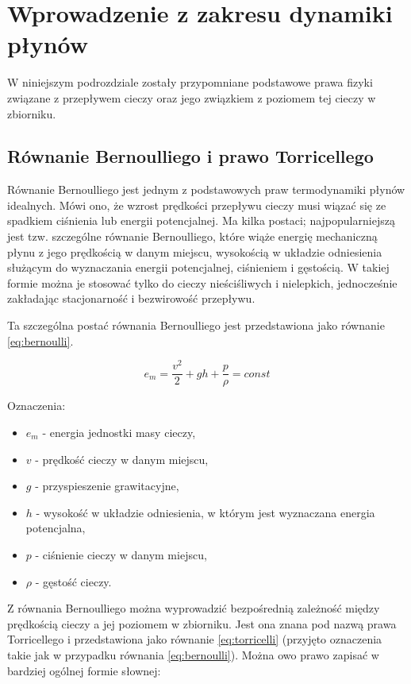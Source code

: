\section{Wprowadzenie z zakresu dynamiki płynów}
\label{sec:plyny}

W niniejszym podrozdziale zostały przypomniane podstawowe prawa fizyki związane z przepływem cieczy oraz jego związkiem z poziomem tej cieczy w zbiorniku.

\subsection{Równanie Bernoulliego i prawo Torricellego}
\label{sub:plyny-torr}

Równanie Bernoulliego jest jednym z podstawowych praw termodynamiki płynów idealnych. Mówi ono, że wzrost prędkości przepływu cieczy musi wiązać się ze spadkiem ciśnienia lub energii potencjalnej.
Ma kilka postaci; najpopularniejszą jest tzw. szczególne równanie Bernoulliego, które wiąże energię mechaniczną płynu z jego prędkością w danym miejscu, wysokością w układzie odniesienia służącym do wyznaczania energii potencjalnej, ciśnieniem i gęstością.
W takiej formie można je stosować tylko do cieczy nieściśliwych i nielepkich, jednocześnie zakładając stacjonarność i bezwirowość przepływu.

Ta szczególna postać równania Bernoulliego jest przedstawiona jako równanie \ref{eq:bernoulli}.

\begin{equation}\label{eq:bernoulli}
e_{m} = \frac{v^2}{2} + gh + \frac{p}{\rho} = const
\end{equation}

Oznaczenia:
\begin{itemize}
	\item $e_{m}$ - energia jednostki masy cieczy,
	\item $v$ - prędkość cieczy w danym miejscu,
	\item $g$ - przyspieszenie grawitacyjne,
	\item $h$ - wysokość w układzie odniesienia, w którym jest wyznaczana energia potencjalna,
	\item $p$ - ciśnienie cieczy w danym miejscu,
	\item $\rho$ - gęstość cieczy.
\end{itemize}

Z równania Bernoulliego można wyprowadzić bezpośrednią zależność między prędkością cieczy a jej poziomem w zbiorniku. Jest ona znana pod nazwą prawa Torricellego i przedstawiona jako równanie \ref{eq:torricelli} (przyjęto oznaczenia takie jak w przypadku równania \ref{eq:bernoulli}).
Można owo prawo zapisać w bardziej ogólnej formie słownej:

